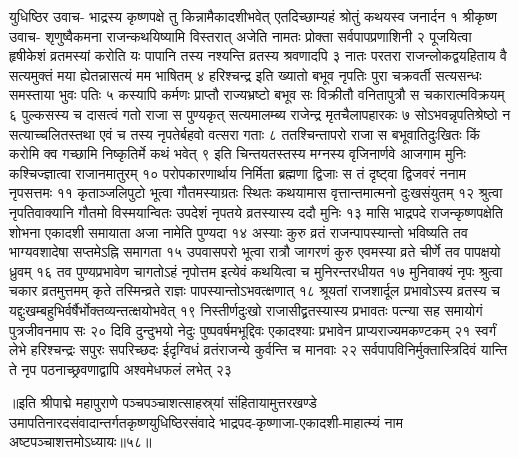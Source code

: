 युधिष्ठिर उवाच-
भाद्रस्य कृष्णपक्षे तु किन्नामैकादशीभवेत् 
एतदिच्छाम्यहं श्रोतुं कथयस्व जनार्दन १
श्रीकृष्ण उवाच-
शृणुष्वैकमना राजन्कथयिष्यामि विस्तरात् 
अजेति नामतः प्रोक्ता सर्वपापप्रणाशिनी २
पूजयित्वा हृषीकेशं व्रतमस्यां करोति यः 
पापानि तस्य नश्यन्ति व्रतस्य श्रवणादपि ३
नातः परतरा राजन्लोकद्वयहिताय वै 
सत्यमुक्तं मया ह्येतन्नासत्यं मम भाषितम् ४
हरिश्चन्द्र इति ख्यातो बभूव नृपतिः पुरा 
चक्रवर्ती सत्यसन्धः समस्ताया भुवः पतिः ५
कस्यापि कर्मणः प्राप्तौ राज्यभ्रष्टो बभूव सः 
विक्रीतौ वनितापुत्रौ स चकारात्मविक्रयम् ६
पुल्कसस्य च दासत्वं गतो राजा स पुण्यकृत् 
सत्यमालम्ब्य राजेन्द्र मृतचैलापहारकः ७
सोऽभवन्नृपतिश्रेष्ठो न सत्याच्चलितस्तथा 
एवं च तस्य नृपतेर्बहवो वत्सरा गताः ८
ततश्चिन्तापरो राजा स बभूवातिदुःखितः 
किं करोमि क्व गच्छामि निष्कृतिर्मे कथं भवेत् ९
इति चिन्तयतस्तस्य मग्नस्य वृजिनार्णवे 
आजगाम मुनिः कश्चिज्ज्ञात्वा राजानमातुरम् १०
परोपकारणार्थाय निर्मिता ब्रह्मणा द्विजाः 
स तं दृष्ट्वा द्विजवरं ननाम नृपसत्तमः ११
कृताञ्जलिपुटो भूत्वा गौतमस्याग्रतः स्थितः 
कथयामास वृत्तान्तमात्मनो दुःखसंयुतम् १२
श्रुत्वा नृपतिवाक्यानि गौतमो विस्मयान्वितः 
उपदेशं नृपतये व्रतस्यास्य ददौ मुनिः १३
मासि भाद्रपदे राजन्कृष्णपक्षेति शोभना 
एकादशी समायाता  अजा नामेति पुण्यदा १४
अस्याः कुरु व्रतं राजन्पापस्यान्तो भविष्यति 
तव भाग्यवशादेषा सप्तमेऽह्नि समागता १५
उपवासपरो भूत्वा रात्रौ जागरणं कुरु 
एवमस्या व्रते चीर्णे तव पापक्षयो ध्रुवम् १६
तव पुण्यप्रभावेण चागतोऽहं नृपोत्तम 
इत्येवं कथयित्वा च मुनिरन्तरधीयत १७
मुनिवाक्यं नृपः श्रुत्वा चकार व्रतमुत्तमम् 
कृते तस्मिन्व्रते राज्ञः पापस्यान्तोऽभवत्क्षणात् १८
श्रूयतां राजशार्दूल प्रभावोऽस्य व्रतस्य च 
यद्दुःखम्बहुभिर्वर्षैर्भोक्तव्यन्तत्क्षयोभवेत् १९
निस्तीर्णदुःखो राजासीद्व्रतस्यास्य प्रभावतः 
पत्न्या सह समायोगं पुत्रजीवनमाप सः २०
दिवि दुन्दुभयो नेदुः पुष्पवर्षमभूद्दिवः 
एकादश्याः प्रभावेन प्राप्यराज्यमकण्टकम् २१
स्वर्गं लेभे हरिश्चन्द्रः सपुरः सपरिच्छदः 
ईदृग्विधं व्रतंराजन्ये कुर्वन्ति च मानवाः २२
सर्वपापविनिर्मुक्तास्त्रिदिवं यान्ति ते नृप 
पठनाच्छ्रवणाद्वापि अश्वमेधफलं लभेत् २३

॥इति श्रीपाद्मे महापुराणे पञ्चपञ्चाशत्साहस्र्यां संहितायामुत्तरखण्डे उमापतिनारदसंवादान्तर्गतकृष्णयुधिष्ठिरसंवादे भाद्रपद-कृष्णाजा-एकादशी-माहात्म्यं नाम अष्टपञ्चाशत्तमोऽध्यायः॥५८॥



